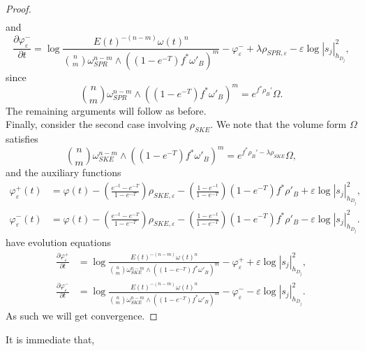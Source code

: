\documentclass[12pt]{article}
\numberwithin{equation}{section}
\renewcommand{\d}{\partial}
\newcommand{\e}{\varepsilon}
\begin{document}
\begin{proof}
\begin{align*}
\end{align*}
and
\begin{equation*}
    \frac{\d \varphi_{\e}^-}{\d t} = \log \frac{E(t)^{-(n-m)} \omega(t)^n}{{n \choose m} \omega_{SPR}^{n-m} \wedge ((1-e^{-T})f^* \omega'_B)^m} - \varphi_{\e}^{-} + \lambda \rho_{SPR,\e} - \e \log |s_j|^2_{h_{D_j}},
\end{equation*}
since
\begin{equation*}
    {n \choose m} \omega_{SPR}^{n-m} \wedge ((1-e^{-T})f^*\omega'_B)^m = e^{f^*\rho_B'} \Omega.
\end{equation*}
The remaining arguments will follow as before.\\
Finally, consider the second case involving $\rho_{SKE}$. We note that the volume form $\Omega$ satisfies
\begin{equation*}
    {n\choose m} \omega_{SKE}^{n-m} \wedge ((1-e^{-T}) f^*\omega'_B)^m = e^{f^*\rho_B'-\lambda \rho_{SKE}}\Omega,
\end{equation*}
and the auxiliary functions
\begin{align*}
    \varphi_{\e}^{+}(t) &= \varphi(t) - \left(\frac{e^{-t}-e^{-T}}{1-e^{-T}}\right) \rho_{SKE,\e} - \left(\frac{1-e^{-t}}{1-e^{-T}} \right) (1-e^{-T})f^*\rho'_{B} + \e \log|s_j|_{h_{D_j}}^2,\\
    \varphi_{\e}^{-}(t) &= \varphi(t) - \left(\frac{e^{-t}-e^{-T}}{1-e^{-T}}\right) \rho_{SKE,\e} - \left(\frac{1-e^{-t}}{1-e^{-T}}\right) (1-e^{-T})f^*\rho'_{B} - \e \log|s_j|_{h_{D_j}}^2.
\end{align*}
have evolution equations
\begin{align*}
    \frac{\d \varphi_{\e}^+}{\d t} &= \log \frac{E(t)^{-(n-m)} \omega(t)^n}{{n \choose m} \omega_{SKE}^{n-m} \wedge ((1-e^{-T})f^* \omega'_B)^m} - \varphi_{\e}^{+} + \e \log |s_j|^2_{h_{D_j}},\\
    \frac{\d \varphi_{\e}^-}{\d t} &= \log \frac{E(t)^{-(n-m)} \omega(t)^n}{{n \choose m} \omega_{SKE}^{n-m} \wedge ((1-e^{-T})f^* \omega'_B)^m} - \varphi_{\e}^{-} - \e \log |s_j|^2_{h_{D_j}}.
\end{align*}
As such we will get convergence.
\end{proof}

\noindent It is immediate that,
\end{document}
